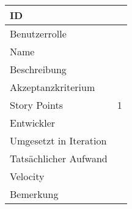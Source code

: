 \begin{tabularx}{\textwidth}{|p{}|X|}
	\hline
	ID & \\
	\hline
	Benutzerrolle & \\
	\hline
	Name & \\
	\hline
	Beschreibung & \\
	\hline
	Akzeptanzkriterium & \\
	\hline
	Story Points & 1\\
	\hline
	Entwickler & \\
	\hline
	Umgesetzt in Iteration & \\ 
	\hline
	Tatsächlicher Aufwand & \\
	\hline
	Velocity & \\
	\hline
	Bemerkung & \\
	\hline
\end{tabularx}
\vspace{20pt}
